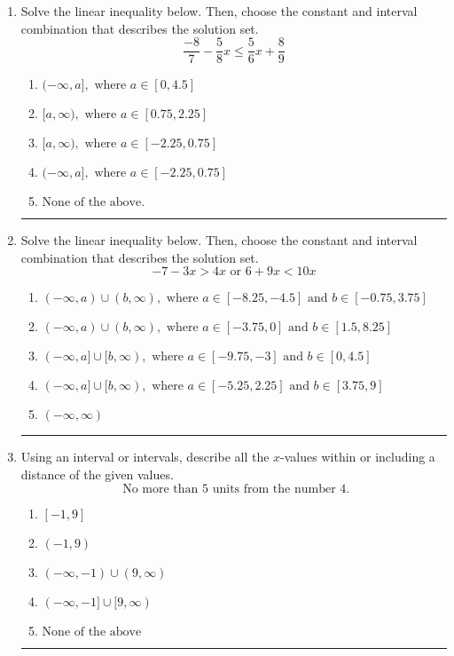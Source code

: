 \documentclass[14pt]{extbook}
\newcommand{\litem}[1]{\item#1\hspace*{-1cm}\rule{\textwidth}{0.4pt}}
\begin{document}
\begin{enumerate}
{\begin{enumerate}[label=\Alph*.]
\end{enumerate} }
\litem{
Solve the linear inequality below. Then, choose the constant and interval combination that describes the solution set.\[ \frac{-8}{7} - \frac{5}{8} x \leq \frac{5}{6} x + \frac{8}{9} \]\begin{enumerate}[label=\Alph*.]
\item \( (-\infty, a], \text{ where } a \in [0, 4.5] \)
\item \( [a, \infty), \text{ where } a \in [0.75, 2.25] \)
\item \( [a, \infty), \text{ where } a \in [-2.25, 0.75] \)
\item \( (-\infty, a], \text{ where } a \in [-2.25, 0.75] \)
\item \( \text{None of the above}. \)

\end{enumerate} }
\litem{
Solve the linear inequality below. Then, choose the constant and interval combination that describes the solution set.\[ -7 - 3 x > 4 x \text{ or } 6 + 9 x < 10 x \]\begin{enumerate}[label=\Alph*.]
\item \( (-\infty, a) \cup (b, \infty), \text{ where } a \in [-8.25, -4.5] \text{ and } b \in [-0.75, 3.75] \)
\item \( (-\infty, a) \cup (b, \infty), \text{ where } a \in [-3.75, 0] \text{ and } b \in [1.5, 8.25] \)
\item \( (-\infty, a] \cup [b, \infty), \text{ where } a \in [-9.75, -3] \text{ and } b \in [0, 4.5] \)
\item \( (-\infty, a] \cup [b, \infty), \text{ where } a \in [-5.25, 2.25] \text{ and } b \in [3.75, 9] \)
\item \( (-\infty, \infty) \)

\end{enumerate} }
\litem{
Using an interval or intervals, describe all the $x$-values within or including a distance of the given values.\[ \text{ No more than } 5 \text{ units from the number } 4. \]\begin{enumerate}[label=\Alph*.]
\item \( [-1, 9] \)
\item \( (-1, 9) \)
\item \( (-\infty, -1) \cup (9, \infty) \)
\item \( (-\infty, -1] \cup [9, \infty) \)
\item \( \text{None of the above} \)


\end{enumerate}}
\end{enumerate}
\end{document}
